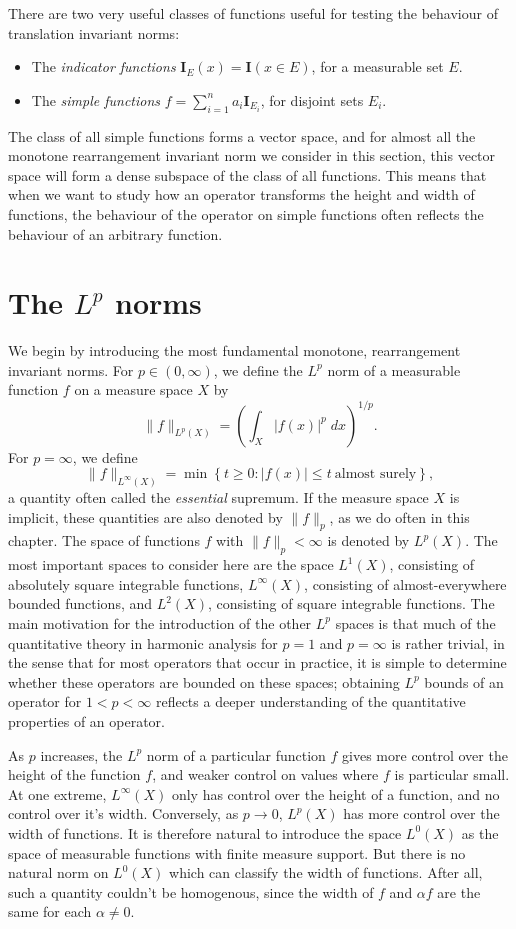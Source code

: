 There are two very useful classes of functions useful for testing the behaviour of translation invariant norms:
%
\begin{itemize}
    \item The \emph{indicator functions} $\mathbf{I}_E(x) = \mathbf{I}(x \in E)$, for a measurable set $E$.
    \item The \emph{simple functions} $f = \sum_{i = 1}^n a_i \mathbf{I}_{E_i}$, for disjoint sets $E_i$.
\end{itemize}
%
The class of all simple functions forms a vector space, and for almost all the monotone rearrangement invariant norm we consider in this section, this vector space will form a dense subspace of the class of all functions. This means that when we want to study how an operator transforms the height and width of functions, the behaviour of the operator on simple functions often reflects the behaviour of an arbitrary function.

\section{The $L^p$ norms}

We begin by introducing the most fundamental monotone, rearrangement invariant norms. For $p \in (0,\infty)$, we define the $L^p$ norm of a measurable function $f$ on a measure space $X$ by
%
\[ \| f \|_{L^p(X)} = \left( \int_X |f(x)|^p\; dx \right)^{1/p}. \]
%
For $p = \infty$, we define
%
\[ \| f \|_{L^\infty(X)} = \min \left\{ t \geq 0: |f(x)| \leq t\ \text{almost surely} \right\}, \]
%
a quantity often called the \emph{essential} supremum. If the measure space $X$ is implicit, these quantities are also denoted by $\| f \|_p$, as we do often in this chapter. The space of functions $f$ with $\| f \|_p < \infty$ is denoted by $L^p(X)$. The most important spaces to consider here are the space $L^1(X)$, consisting of absolutely square integrable functions, $L^\infty(X)$, consisting of almost-everywhere bounded functions, and $L^2(X)$, consisting of square integrable functions. The main motivation for the introduction of the other $L^p$ spaces is that much of the quantitative theory in harmonic analysis for $p = 1$ and $p = \infty$ is rather trivial, in the sense that for most operators that occur in practice, it is simple to determine whether these operators are bounded on these spaces; obtaining $L^p$ bounds of an operator for $1 < p < \infty$ reflects a deeper understanding of the quantitative properties of an operator.

As $p$ increases, the $L^p$ norm of a particular function $f$ gives more control over the height of the function $f$, and weaker control on values where $f$ is particular small. At one extreme, $L^\infty(X)$ only has control over the height of a function, and no control over it's width. Conversely, as $p \to 0$, $L^p(X)$ has more control over the width of functions. It is therefore natural to introduce the space $L^0(X)$ as the space of measurable functions with finite measure support. But there is no natural norm on $L^0(X)$ which can classify the width of functions. After all, such a quantity couldn't be homogenous, since the width of $f$ and $\alpha f$ are the same for each $\alpha \neq 0$.

